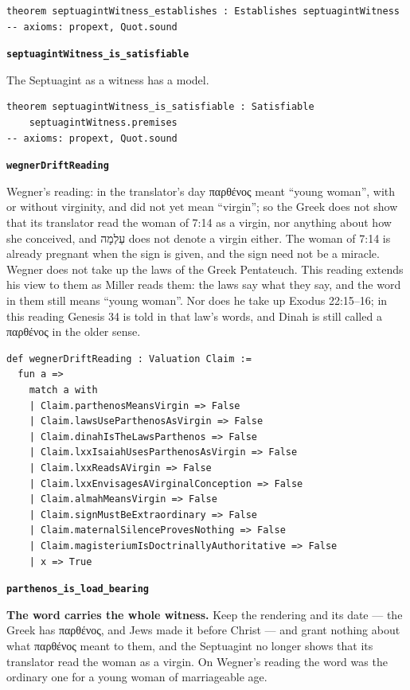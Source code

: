 \documentclass[11pt]{article}
\begin{document}
{\small\begin{verbatim}
theorem septuagintWitness_establishes : Establishes septuagintWitness
-- axioms: propext, Quot.sound
\end{verbatim}}
\par\medskip\noindent\textbf{\texttt{septuagint\allowbreak{}Witness\_\allowbreak{}is\_\allowbreak{}satisfiable}}\par\nobreak\noindent
The Septuagint as a witness has a model.

{\small\begin{verbatim}
theorem septuagintWitness_is_satisfiable : Satisfiable
    septuagintWitness.premises
-- axioms: propext, Quot.sound
\end{verbatim}}
\par\medskip\noindent\textbf{\texttt{wegner\allowbreak{}Drift\allowbreak{}Reading}}\par\nobreak\noindent
Wegner’s reading: in the translator’s day παρθένος meant “young woman”, with or without virginity, and did not yet mean “virgin”; so the Greek does not show that its translator read the woman of 7:14 as a virgin, nor anything about how she conceived, and עַלְמָה does not denote a virgin either. The woman of 7:14 is already pregnant when the sign is given, and the sign need not be a miracle. Wegner does not take up the laws of the Greek Pentateuch. This reading extends his view to them as Miller reads them: the laws say what they say, and the word in them still means “young woman”. Nor does he take up Exodus 22:15–16; in this reading Genesis 34 is told in that law’s words, and Dinah is still called a παρθένος in the older sense.

{\small\begin{verbatim}
def wegnerDriftReading : Valuation Claim :=
  fun a =>
    match a with
    | Claim.parthenosMeansVirgin => False
    | Claim.lawsUseParthenosAsVirgin => False
    | Claim.dinahIsTheLawsParthenos => False
    | Claim.lxxIsaiahUsesParthenosAsVirgin => False
    | Claim.lxxReadsAVirgin => False
    | Claim.lxxEnvisagesAVirginalConception => False
    | Claim.almahMeansVirgin => False
    | Claim.signMustBeExtraordinary => False
    | Claim.maternalSilenceProvesNothing => False
    | Claim.magisteriumIsDoctrinallyAuthoritative => False
    | x => True
\end{verbatim}}
\par\medskip\noindent\textbf{\texttt{parthenos\_\allowbreak{}is\_\allowbreak{}load\_\allowbreak{}bearing}}\par\nobreak\noindent
\textbf{The word carries the whole witness.} Keep the rendering and its date — the Greek has παρθένος, and Jews made it before Christ — and grant nothing about what παρθένος meant to them, and the Septuagint no longer shows that its translator read the woman as a virgin. On Wegner’s reading the word was the ordinary one for a young woman of marriageable age.
\end{document}
